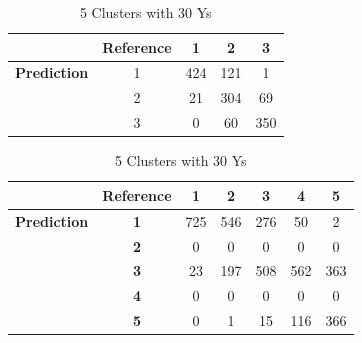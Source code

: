 \documentclass{article}
\begin{document}
\begin{table}[htbp!]
  \begin{minipage}{0.45\textwidth}
    \centering
    \begin{tabular}{c|c|c|c|c}
              & \textbf{Reference} & 1 & 2 & 3 \\
    \hline
    \textbf{Prediction} & 1 & 424 & 121 & 1 \\
                        & 2 & 21 & 304 & 69 \\
                        & 3 & 0 & 60 & 350 \\
    \end{tabular}
    \caption{3 Clusters with 30 Ys}
    \label{tab:3_clu_30}
  \end{minipage}
  \hfill
  \begin{minipage}{0.45\textwidth}
    \centering
    \begin{tabular}{c|c|c|c|c|c|c}
      & \textbf{Reference} & \textbf{1} & \textbf{2} & \textbf{3} & \textbf{4} & \textbf{5} \\
      \hline
      \textbf{Prediction} & \textbf{1} & 725 & 546 & 276 & 50 & 2 \\
                          & \textbf{2} & 0 & 0 & 0 & 0 & 0 \\
                          & \textbf{3} & 23 & 197 & 508 & 562 & 363 \\
                          & \textbf{4} & 0 & 0 & 0 & 0 & 0 \\
                          & \textbf{5} & 0 & 1 & 15 & 116 & 366 \\
    \end{tabular}
    \caption{5 Clusters with 30 Ys}
    \label{tab:5_clu_30}
  \end{minipage}

  \vspace{1em} %


\end{table}
\end{document}
